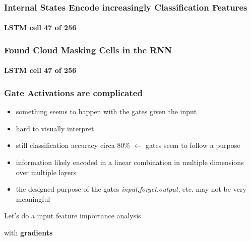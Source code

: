 %
%
%
%
%
%



\begin{frame}
\frametitle{Internal States Encode increasingly Classification Features}
\framesubtitle{LSTM cell \textbf{47} of 256}
\end{frame}
%
\begin{frame}
\frametitle{Found Cloud Masking Cells in the RNN}
\framesubtitle{LSTM cell \textbf{47} of 256}
\end{frame}

\begin{frame}
\frametitle{Gate Activations are complicated}

\begin{itemize}
\item something seems to happen with the gates given the input
\item hard to visually interpret
\item still classification accuracy circa 80\% $\leftarrow$ gates seem to follow a purpose
\item information likely encoded in a linear combination in multiple dimensions over multiple layers
\item the designed purpose of the gates \emph{input},\emph{forget},\emph{output}, etc. may not be very meaningful
\end{itemize}
\end{frame}

{
\begin{frame}[plain]

\vspace{8em}
\begin{center}
\Huge\color{tumwhite}
Let's do a input feature importance analysis
\end{center}\color{white}

\end{frame}
}

{
\begin{frame}[plain]

\vspace{8em}
\begin{center}
\Huge\color{tumbluedark}
with \textbf{gradients}
\end{center}\color{white}

\end{frame}
}

